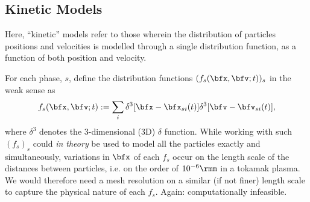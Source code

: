 \subsection{Kinetic Models}

    \line

    \begin{definition}\label{def:kinetic model}
        Here, ``kinetic'' models refer to those wherein the distribution of particles positions and velocities is modelled through a single distribution function, as a function of both position and velocity.
    \end{definition}
    
    \line

    For each phase, $s$, define the distribution functions $(f_{s}(\bfx, \bfv; t))_{s}$ in the weak sense as
    \begin{equation}\label{eqn:distribution function definition}
        f_{s}(\bfx, \bfv; t)  :=  \sum_{i}\delta^{3}[\bfx - \bfx_{si}(t)]\delta^{3}[\bfv - \bfv_{si}(t)],
    \end{equation}
    where $\delta^{3}$ denotes the 3-dimensional (3D) $\delta$ function. While working with such $(f_{s})_{s}$ could \emph{in theory} be used to model all the particles exactly and simultaneously, variations in $\bfx$ of each $f_{s}$ occur on the length scale of the distances between particles, i.e. on the order of $10^{- 6}\rmm$ in a tokamak plasma. We would therefore need a mesh resolution on a similar (if not finer) length scale to capture the physical nature of each $f_{s}$. Again: computationally infeasible.

